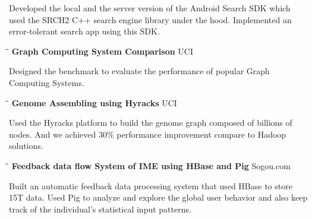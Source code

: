 \documentclass{res}
\begin{document}
\begin{resume}
\begin{tabbing}
   \end{tabbing}\vspace{-30pt}      %
   Developed the local and the server version of the Android Search SDK which used the SRCH2 C++ search engine library under the hood. Implemented an error-tolerant search app using this SDK.
   \vspace{-0.1in}
   \begin{tabbing}
   \hspace{2in}\= \hspace{3in}\= \kill %
    {\bf Graph Computing System Comparison }\> \>UCI     \\
   \end{tabbing}\vspace{-30pt}      %
   Designed the benchmark to evaluate the performance of popular Graph Computing Systems. %
%
   \vspace{-0.1in}
   \begin{tabbing}
   \hspace{2in}\= \hspace{3in}\= \kill %
    {\bf Genome Assembling using Hyracks }\> \>UCI     \\
   \end{tabbing}\vspace{-30pt}      %
   Used the Hyracks platform to build the genome graph composed of billions of nodes. And we achieved 30\% performance improvement compare to Hadoop solutions.
%
   \vspace{-0.1in}
   \begin{tabbing}
   \hspace{2in}\= \hspace{3in}\= \kill %
    {\bf Feedback data flow System of IME using HBase and Pig}\> \>Sogou.com     \\
   \end{tabbing}\vspace{-30pt}      %
   Built an automatic feedback data processing system that used HBase to store 15T data. Used Pig to analyze and explore the global user behavior and also keep track of the individual's statistical input patterns.
   \vspace{-0.1in}

\end{resume}
\end{document}
